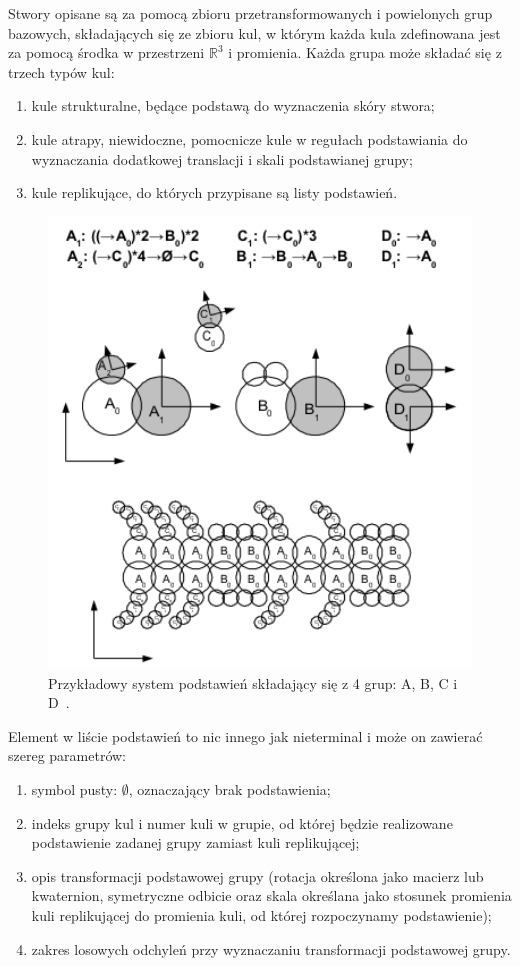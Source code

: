 Stwory opisane są za pomocą zbioru przetransformowanych i powielonych grup
bazowych, składających się ze zbioru kul, w którym każda kula zdefinowana jest
za pomocą środka w przestrzeni $\mathbb{R}^3$ i promienia. Każda grupa może
składać się z trzech typów kul:
\begin{enumerate}
  \item kule strukturalne, będące podstawą do wyznaczenia skóry stwora;
  \item kule atrapy, niewidoczne, pomocnicze kule w regułach podstawiania do
  wyznaczania dodatkowej translacji i skali podstawianej grupy;
  \item kule replikujące, do których przypisane są listy podstawień.
\end{enumerate}

\begin{figure}[h!]
  \centering
  \includegraphics[width=12cm]{images/sys_podst.png}
  \caption{Przykładowy system podstawień składający się z 4 grup: A, B, C i
  D~\cite{dabrowski}.}
  \label{sys_podst}
\end{figure}

Element w liście podstawień to nic innego jak nieterminal i może on zawierać
szereg parametrów:
\begin{enumerate}
  \item symbol pusty: $\emptyset$, oznaczający brak podstawienia;
  \item indeks grupy kul i numer kuli w grupie, od której będzie realizowane
  podstawienie zadanej grupy zamiast kuli replikującej;
  \item opis transformacji podstawowej grupy (rotacja określona jako macierz
  lub kwaternion, symetryczne odbicie oraz skala określana jako stosunek
  promienia kuli replikującej do promienia kuli, od której rozpoczynamy
  podstawienie);
  \item zakres losowych odchyleń przy wyznaczaniu transformacji podstawowej
  grupy.
\end{enumerate}

